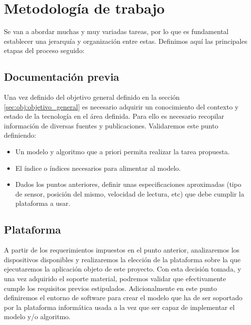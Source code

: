 \begin{comment}
Conjunto de objetivos más específicos alcanzables por separado. suelen ser los diferentes pasos a seguir para conseguir el objetivo general. Han de ser smart, los verbos deberían ser:     • Analizar
Calcular
Clasificar
Comparar
Conocer
Cuantificar
Desarrollar
Describir
Descubrir
Determinar
Establecer
Explorar
Identificar
Indagar
Medir
Sintetizar
Verificar
\end{comment}

\section{Metodología de trabajo}

Se van a abordar muchas y muy variadas tareas, por lo que es fundamental establecer una jerarquía y organización entre estas. Definimos aquí las principales etapas del proceso seguido:

\subsection{Documentación previa}

Una vez definido del objetivo general definido en la sección \ref{sec:obj:objetivo_general} es necesario adquirir un conocimiento del contexto y estado de la tecnología en el área definida. Para ello es necesario recopilar información de diversas fuentes y publicaciones. Validaremos este punto definiendo:
\begin{itemize}
  \item Un modelo y algoritmo que a priori permita realizar la tarea propuesta.
  \item El índice o índices necesarios para alimentar al modelo.
  \item Dados los puntos anteriores, definir unas especificaciones aproximadas (tipo de sensor, posición del mismo, velocidad de lectura, etc) que debe cumplir la plataforma a usar.
\end{itemize}

\subsection{Plataforma}
A partir de los requerimientos impuestos en el punto anterior, analizaremos los dispositivos disponibles y realizaremos la elección de la plataforma sobre la que ejecutaremos la aplicación objeto de este proyecto. Con esta decisión tomada, y una vez adquirido el soporte material, podremos validar que efectivamente cumple los requisitos previos estipulados. Adicionalmente en este punto definiremos el entorno de software para crear el modelo que ha de ser soportado por la plataforma informática usada a la vez que ser capaz de implementar el modelo y/o algoritmo.


